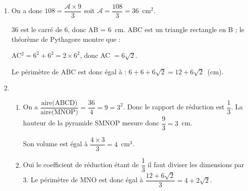 
\medskip

% 
% 
% 

\begin{enumerate}
\item %
On a donc $108 = \dfrac{\mathcal{A} \times 9}{3} $ soit $\mathcal{A} = \dfrac{108}{3} = 36$~cm$^2$.

36 est le carré de 6, donc AB = 6~cm. 
ABC est un triangle rectangle en B ; le théorème de Pythagore montre que :

AC$^2 = 6^2 + 6^2 = 2\times 6^2$, donc AC $ = 6\sqrt{2}$.

Le périmètre de ABC est donc égal à : $6 + 6 + 6\sqrt{2} = 12 + 6\sqrt{2}$~(cm).
\item  %
 
	\begin{enumerate}
		\item %
On a $\dfrac{\text{aire(ABCD)}}{\text{aire(MNOP)}} = \dfrac{36}{4} = 9 = 3^2$. Donc le rapport de réduction est $\dfrac{1}{3}$. La hauteur de la pyramide SMNOP mesure donc $\dfrac{9}{3} = 3$~cm.

Son volume est égal à $\dfrac{4 \times 3}{3} = 4 $~cm$^3$.  
		\item %

 
Oui le coefficient de réduction étant de $\dfrac{1}{3}$ il faut diviser les dimensions par 3.
Le périmètre de MNO est donc égal à $\dfrac{12 + 6\sqrt{2}}{3} = 4 + 2\sqrt{2}$.
	\end{enumerate} 
\end{enumerate}
